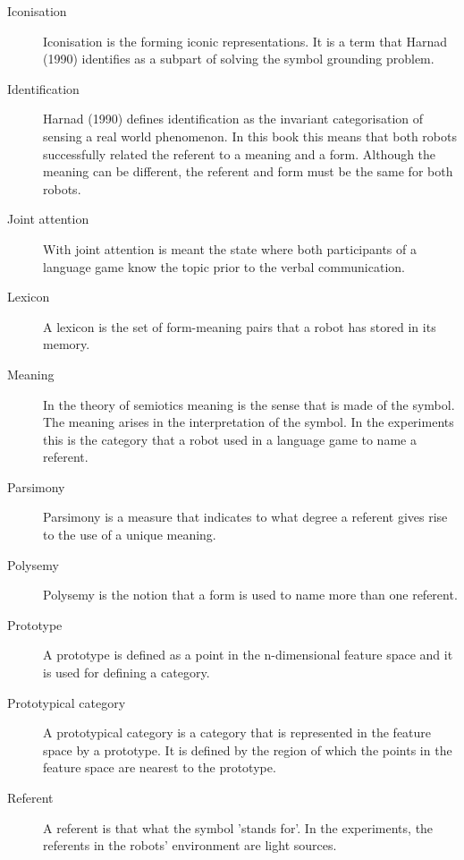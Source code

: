 \begin{description}
\item[Iconisation] Iconisation is the forming iconic representations. It is a term that Harnad (1990) identifies as a subpart of solving the symbol grounding problem.

\item[Identification]  Harnad (1990) defines identification as the invariant categorisation of sensing a real world phenomenon. In this book this means that both robots successfully related the referent to a meaning and a form. Although the meaning can be different, the referent and form must be the same for both robots.

\item[Joint attention] With joint attention is meant the state where both participants of a language game know the topic prior to the verbal communication.

\item[Lexicon] A lexicon is the set of form-meaning pairs that a robot has stored in its memory.

\item[Meaning] In the theory of semiotics meaning is the sense that is made of the symbol. The meaning arises in the interpretation of the symbol. In the experiments this is the category that a robot used in a language game to name a referent.

\item[Parsimony] Parsimony is a measure that indicates to what degree a referent gives rise to the use of a unique meaning.

\item[Polysemy] Polysemy is the notion that a form is used to name more than one referent.

\item[Prototype] A prototype is defined as a point in the n-dimensional feature space and it is used for defining a category.

\item[Prototypical category] A prototypical category is a category that is represented in the feature space by a prototype. It is defined by the region of which the points in the feature space are nearest to the prototype.

\item[Referent] A referent is that what the symbol 'stands for'. In the experiments, the referents in the robots' environment are light sources.


\end{description}
